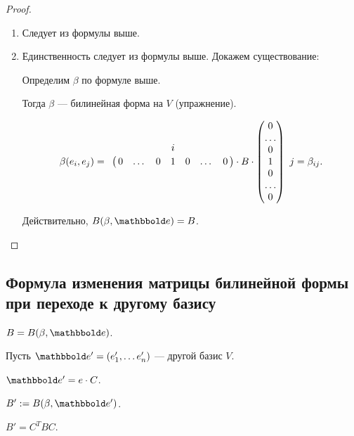 \begin{proof}~
    \begin{enumerate}
    \item Следует из формулы выше.
    \item Единственность следует из формулы выше. Докажем существование:

        Определим $\beta$ по формуле выше.

        Тогда $\beta$ --- билинейная форма на $V$ (упражнение).

        \begin{equation*}
            \beta(e_i, e_j) = \bordermatrix{
                  &   &   &   & i &   &   &  \cr
                  & 0 & \dots & 0 & 1 & 0 & \dots & 0
            } \cdot B \cdot \begin{pmatrix} 
                0 \\ \dots \\ 0 \\ 1 \\ 0 \\ \dots \\ 0
            \end{pmatrix} \ j = \beta_{ij}
        .\end{equation*}

        Действительно, $B(\beta, \E) = B$.
        \qedhere
    \end{enumerate}
\end{proof}


\subsection{Формула изменения матрицы билинейной формы при переходе к другому базису}

$B = B(\beta, \E)$.

Пусть $\E' = (e'_1, \dots e'_n)$ --- другой базис $V$.

$\E' = e \cdot C$.

$B' := B(\beta, \E')$.

\begin{proposal}
    $B' = C^{T} B C$.
\end{proposal}

